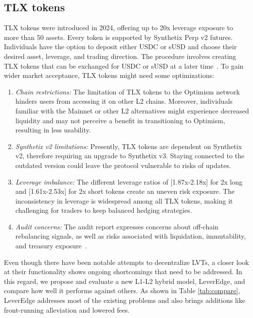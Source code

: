 \subsection{TLX tokens}\label{subsec:tlx}
TLX tokens were introduced in 2024, offering up to 20x leverage exposure to more than 50 assets. Every token is supported by Synthetix Perp v2 futures. Individuals have the option to deposit either USDC or sUSD and choose their desired asset, leverage, and trading direction. The procedure involves creating TLX tokens that can be exchanged for USDC or sUSD at a later time~\cite{TLX_Doc1,TLX_Doc2}. To gain wider market acceptance, TLX tokens might need some optimizations:
\begin{enumerate}[label={\ref{subsec:tlx}.\arabic*},leftmargin=*]
	\item \textit{Chain restrictions:} The limitation of TLX tokens to the Optimism network hinders users from accessing it on other L2 chains. Moreover, individuals familiar with the Mainnet or other L2 alternatives might experience decreased liquidity and may not perceive a benefit in transitioning to Optimism, resulting in less usability.
	
	\item \textit{Synthetix v2 limitations:} Presently, TLX tokens are dependent on Synthetix v2, therefore requiring an upgrade to Synthetix v3. Staying connected to the outdated version could leave the protocol vulnerable to risks of updates.
	
	
	\item \textit{Leverage imbalance:} The different leverage ratios of [1.87x-2.18x] for 2x long and [1.61x-2.53x] for 2x short tokens create an uneven risk exposure. The inconsistency in leverage is widespread among all TLX tokens, making it challenging for traders to keep balanced hedging strategies.
	
	\item \textit{Audit concerns:} The audit report expresses concerns about off-chain rebalancing signals, as well as risks associated with liquidation, immutability, and treasury exposure~\cite{TLX_Audit}.
\end{enumerate}

Even though there have been notable attempts to decentralize LVTs, a closer look at their functionality shows ongoing shortcomings that need to be addressed. In this regard, we propose and evaluate a new L1-L2 hybrid model, LeverEdge, and compare how well it performs against others. As shown in Table \ref{tab:compare}, LeverEdge addresses most of the existing problems and also brings additions like front-running alleviation and lowered fees.

